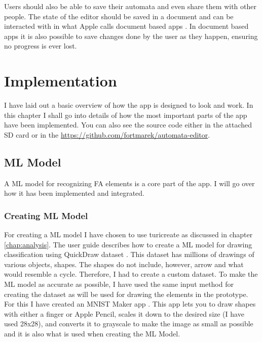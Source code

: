 Users should also be able to save their automata and even share them with other people. The state of the editor should be saved in a document and can be interacted with in what Apple calls document based apps \cite{document-based}. In document based apps it is also possible to save changes done by the user as they happen, ensuring no progress is ever lost.

\chapter{Implementation}
\label{chap:implementation}

I have laid out a basic overview of how the app is designed to look and work. In this chapter I shall go into details of how the most important parts of the app have been implemented. You can also see the source code either in the attached SD card or in the \href{project's repository}{https://github.com/fortmarek/automata-editor}.

\section{ML Model}

A ML model for recognizing FA elements is a core part of the app. I will go over how it has been implemented and integrated.

\subsection{Creating ML Model}

For creating a ML model I have chosen to use turicreate \cite{turicreate} as discussed in chapter \ref{chap:analysis}. The user guide \cite{drawing-classification} describes how to create a ML model for drawing classification using QuickDraw dataset \cite{quickdraw}. This dataset has millions of drawings of various objects, shapes. The shapes do not include, however, arrow and what would resemble a cycle. Therefore, I had to create a custom dataset. To make the ML model as accurate as possible, I have used the same input method for creating the dataset as will be used for drawing the elements in the prototype. For this I have created an MNIST Maker app \cite{mnist-maker}. This app lets you to draw shapes with either a finger or Apple Pencil, scales it down to the desired size (I have used 28x28), and converts it to grayscale to make the image as small as possible and it is also what is used when creating the ML Model.

